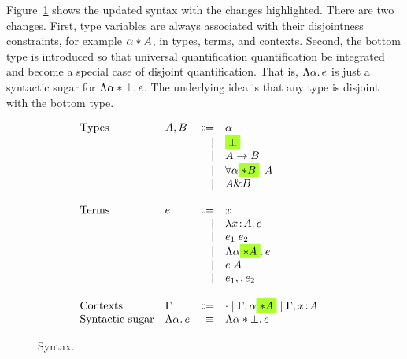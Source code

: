 Figure~\ref{fig:fi-syntax} shows the updated syntax with the changes
highlighted. There are two changes. First, type variables are always associated
with their disjointness constraints, for example $\alpha * A$, in types,
terms, and contexts. Second, the bottom type is introduced so that universal
quantification quantification be integrated and become a special case of
disjoint quantification. That is, $\Lambda \alpha.\, e$ is just a syntactic sugar
for $\Lambda \alpha * \bot.\, e$. The underlying idea is that any type is
disjoint with the bottom type.

\begin{figure}
  \[
    \begin{array}{l}
      \begin{array}{llrll}
        \text{Types}
        & A, B & \Coloneqq & \alpha                  & \\
        &      & \mid & \highlight {$\bot$}          & \\
        &      & \mid & A \to B                      & \\
        &      & \mid & \for {\alpha \highlight {$\disjoint B$}} A  & \\
        &      & \mid & A \inter B                   & \\

        \\
        \text{Terms}
        & e & \Coloneqq & x                        & \\
        &   & \mid & \lam x A e                    & \\
        &   & \mid & \app {e_1} {e_2}              & \\
        &   & \mid & \blam {\alpha \highlight {$\disjoint A$}} e  & \\
        &   & \mid & \tapp e A                     & \\
        &   & \mid & e_1 \mergeop e_2              & \\

        \\
        \text{Contexts}
        & \Gamma & \Coloneqq & \cdot
                   \mid \Gamma, \alpha \highlight {$\disjoint A$}
                   \mid \Gamma, x \hast A  & \\

        \text{Syntactic sugar} & \blam {\alpha} e & \equiv & \blam {\alpha \disjoint \bot} e & \\
      \end{array}
    \end{array}
  \]

  \label{fig:fi-syntax}
  \caption{Syntax.}
\end{figure}

